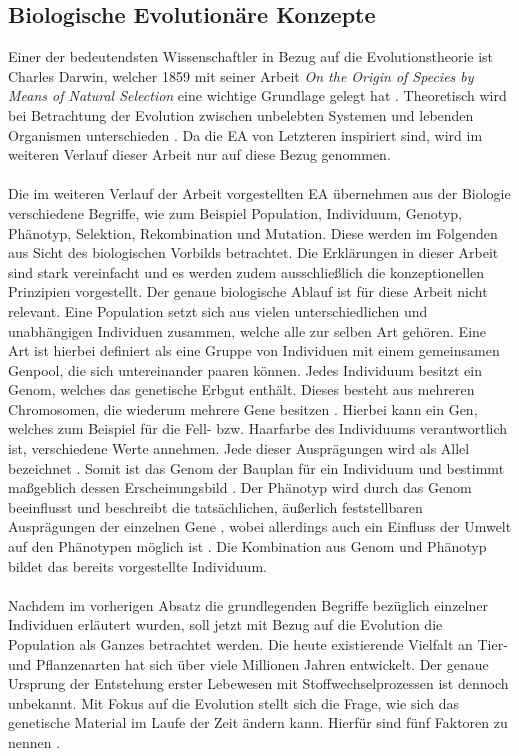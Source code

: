 \subsection{Biologische Evolutionäre Konzepte}
\label{subsec:biological_evolution}
Einer der bedeutendsten Wissenschaftler in Bezug auf die Evolutionstheorie ist Charles Darwin, welcher 1859 mit seiner Arbeit \emph{On the Origin of Species by Means of Natural Selection} eine wichtige Grundlage gelegt hat \cite{russell2013kunstliche}. Theoretisch wird bei Betrachtung der Evolution zwischen unbelebten Systemen und lebenden Organismen unterschieden \cite{weicker2015evolutionare}. Da die \ac{EA} von Letzteren inspiriert sind, wird im weiteren Verlauf dieser Arbeit nur auf diese Bezug genommen.
\\\\
Die im weiteren Verlauf der Arbeit vorgestellten \ac{EA} übernehmen aus der Biologie verschiedene Begriffe, wie zum Beispiel Population, Individuum, Genotyp, Phänotyp, Selektion, Rekombination und Mutation. Diese werden im Folgenden aus Sicht des biologischen Vorbilds betrachtet. Die Erklärungen in dieser Arbeit sind stark vereinfacht und es werden zudem ausschließlich die konzeptionellen Prinzipien vorgestellt. Der genaue biologische Ablauf ist für diese Arbeit nicht relevant. Eine Population setzt sich aus vielen unterschiedlichen und unabhängigen Individuen zusammen, welche alle zur selben Art gehören. Eine Art ist hierbei definiert als eine Gruppe von Individuen mit einem gemeinsamen Genpool, die sich untereinander paaren können. Jedes Individuum besitzt ein Genom, welches das genetische Erbgut enthält. Dieses besteht aus mehreren Chromosomen, die wiederum mehrere Gene besitzen \cite{weicker2015evolutionare}. Hierbei kann ein Gen, welches zum Beispiel für die Fell- bzw. Haarfarbe des Individuums verantwortlich ist, verschiedene Werte annehmen. Jede dieser Ausprägungen wird als Allel bezeichnet \cite{weicker2015evolutionare}. Somit ist das Genom der Bauplan für ein Individuum und bestimmt maßgeblich dessen Erscheinungsbild \cite{kirschbaum2008biopsychologie}. Der Phänotyp wird durch das Genom beeinflusst und beschreibt die tatsächlichen, äußerlich feststellbaren Ausprägungen der einzelnen Gene \cite{weicker2015evolutionare}, wobei allerdings auch ein Einfluss der Umwelt auf den Phänotypen möglich ist \cite{kirschbaum2008biopsychologie}. Die Kombination aus Genom und Phänotyp bildet das bereits vorgestellte Individuum. 
\\\\
Nachdem im vorherigen Absatz die grundlegenden Begriffe bezüglich einzelner Individuen erläutert wurden, soll jetzt mit Bezug auf die Evolution die Population als Ganzes betrachtet werden. Die heute existierende Vielfalt an Tier- und Pflanzenarten hat sich über viele Millionen Jahren entwickelt. Der genaue Ursprung der Entstehung erster Lebewesen mit Stoffwechselprozessen ist dennoch unbekannt. Mit Fokus auf die Evolution stellt sich die Frage, wie sich das genetische Material im Laufe der Zeit ändern kann. Hierfür sind fünf Faktoren zu nennen \cite{weicker2015evolutionare}.
